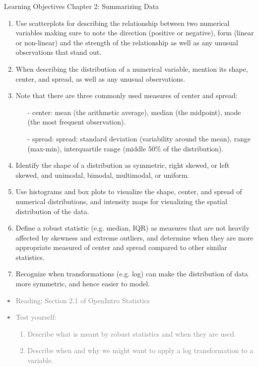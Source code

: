 \documentclass[11pt]{article}
\newcommand{\gray}[1]{\textcolor{gray}{#1}}
\begin{document}
{\LARGE \textcolor{oiB}{Learning Objectives \hfill Chapter 2: Summarizing Data}} \\

\begin{enumerate}
\renewcommand\labelenumi{\textcolor{light}{\textbf{LO \theenumi.}}}
\item Use scatterplots for describing the relationship between two numerical variables making sure to note the direction (positive or negative), form (linear or non-linear) and the strength of the relationship as well as any unusual observations that stand out.
\item When describing the distribution of a numerical variable, mention its shape, center, and spread, as well as any unusual observations.
\item Note that there are three commonly used measures of center and spread: 
\begin{itemize}
\item[-] center: mean (the arithmetic average), median (the midpoint), mode (the most frequent observation).
\item[-] spread: spread: standard deviation (variability around the mean), range (max-min), interquartile range (middle 50\% of the distribution).
\end{itemize}
\item Identify the shape of a distribution as symmetric, right skewed, or left skewed, and unimodal, bimodal, multimodal, or uniform.
\item Use histograms and box plots to visualize the shape, center, and spread of numerical distributions, and intensity maps for visualizing the spatial distribution of the data.
\item Define a robust statistic (e.g. median, IQR) as measures that are not heavily affected by skewness and extreme outliers, and determine when they are more appropriate measured of center and spread compared to other similar statistics.
\item Recognize when transformations (e.g. log) can make the distribution of data more symmetric, and hence easier to model.
\end{enumerate}
\gray{
{\it
\vspace{-0.75cm}
\begin{itemize}
\renewcommand{\labelitemi}{{\textcolor{dark}{$\ast$}}}
\item Reading: Section 2.1 of OpenIntro Statistics
\item Test yourself: 
\begin{enumerate}
\item Describe what is meant by robust statistics and when they are used.
\item Describe when and why we might want to apply a log transformation to a variable. \\
\end{enumerate}
\end{itemize}
}}
\end{document}
